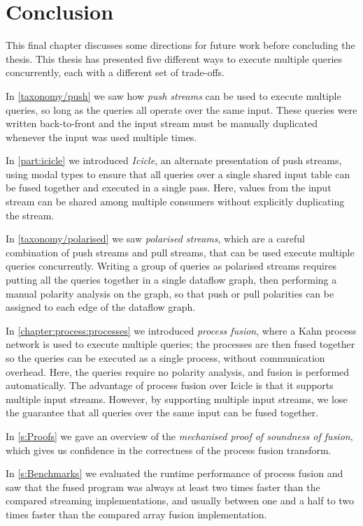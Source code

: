 \chapter{Conclusion}
\label{conclusion}

This final chapter discusses some directions for future work before concluding the thesis.
This thesis has presented five different ways to execute multiple queries concurrently, each with a different set of trade-offs.

In \cref{taxonomy/push} we saw how \emph{push streams} can be used to execute multiple queries, so long as the queries all operate over the same input.
These queries were written back-to-front and the input stream must be manually duplicated whenever the input was used multiple times.

In \cref{part:icicle} we introduced \emph{Icicle}, an alternate presentation of push streams, using modal types to ensure that all queries over a single shared input table can be fused together and executed in a single pass.
Here, values from the input stream can be shared among multiple consumers without explicitly duplicating the stream.

In \cref{taxonomy/polarised} we saw \emph{polarised streams}, which are a careful combination of push streams and pull streams, that can be used execute multiple queries concurrently.
Writing a group of queries as polarised streams requires putting all the queries together in a single dataflow graph, then performing a manual polarity analysis on the graph, so that push or pull polarities can be assigned to each edge of the dataflow graph.

In \cref{chapter:process:processes} we introduced \emph{process fusion}, where a Kahn process network is used to execute multiple queries; the processes are then fused together so the queries can be executed as a single process, without communication overhead.
Here, the queries require no polarity analysis, and fusion is performed automatically.
The advantage of process fusion over Icicle is that it supports multiple input streams.
However, by supporting multiple input streams, we lose the guarantee that all queries over the same input can be fused together.

In \cref{s:Proofs} we gave an overview of the \emph{mechanised proof of soundness of fusion}, which gives us confidence in the correctness of the process fusion transform.

In \cref{s:Benchmarks} we evaluated the runtime performance of process fusion and saw that the fused program was always at least two times faster than the compared streaming implementations, and usually between one and a half to two times faster than the compared array fusion implementation.

